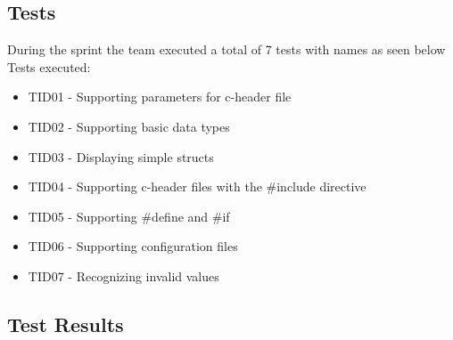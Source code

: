 \subsection{Tests}
During the sprint the team executed a total of 7 tests with names as seen below\\

\noindent Tests executed:

\begin{itemize}
\item TID01 - Supporting parameters for c-header file 
\item TID02 - Supporting basic data types
\item TID03 -  Displaying simple structs 
\item TID04 - Supporting c-header files with the \#include directive
\item TID05 - Supporting \#define and \#if
\item TID06 - Supporting configuration files
\item TID07 - Recognizing invalid values
\end{itemize}

\subsection{Test Results}

\begin{table}[!ht] \footnotesize \center
\caption{Supporting parameters for c-header file \label{tab:sp1_tid01}}
\noindent{}
\end{table}

\begin{table}[!ht] \footnotesize \center
\caption{Supporting basic data types \label{tab:sp1_tid02}}
\noindent{}
\end{table}

